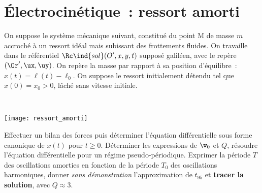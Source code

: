 \documentclass[a4paper, 10pt, final, garamond]{book}
\begin{document}
\setcounter{chapter}{5}

\chapter{Électrocinétique~: ressort amorti}

\begin{enumerate}[label=\sqenumi, leftmargin=10pt]
	\noindent
	\begin{minipage}[t]{.65\linewidth}
		On suppose le système mécanique suivant, constitué du point M de masse $m$
		accroché à un ressort idéal mais subissant des frottements fluides. On
		travaille dans le référentiel $\Rc\ind{sol}(O',x,y,t)$ supposé galiléen,
		avec le repère $(\Or', \ux, \uy)$. On repère la masse par rapport à sa
		position d'équilibre~: $x (t) = \ell(t) - \ell_0$. On suppose le ressort
		initialement détendu tel que $x (0) = x_0 > 0$, lâché sans vitesse initiale.
	\end{minipage}
	\hfill
	\begin{minipage}[t]{.32\linewidth}
		~
		\vspace{-35pt}
		\begin{center}
			\texttt{[image: ressort\_amorti]}
		\end{center}
	\end{minipage}
	Effectuer un bilan des forces puis déterminer l'équation différentielle sous
	forme canonique de $x (t)$ pour $t \geq 0$. Déterminer les expressions de
	$\w_0$ et $Q$, résoudre l'équation différentielle pour un régime
	pseudo-périodique.
	\smallbreak
	Exprimer la période $T$ des oscillations amorties en fonction de la période
	$T_0$ des oscillations harmoniques, donner \textit{sans démonstration}
	l'approximation de $t_{95}$ et \textbf{tracer la solution}, avec $Q \approx
		3$.
	\smallbreak
	\begin{isd}[sidebyside align=top]
\end{isd}
\end{enumerate}
\end{document}

